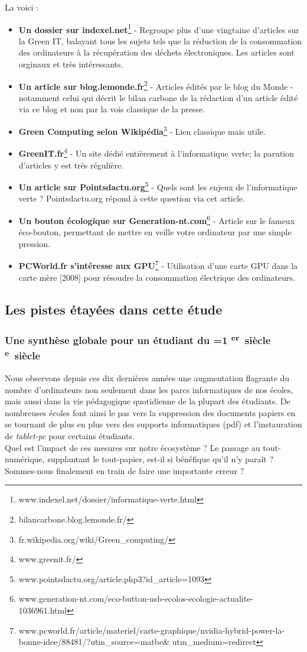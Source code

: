 \documentclass[a4paper,11pt,french]{article}
\newcommand*{\siecle}[1]{%
\ifnum#1=1%
\bsc{\romannumeral #1}\textsuperscript{er}~siècle%
\else%
\bsc{\romannumeral #1}\textsuperscript{e}~siècle%
\fi}
\begin{document}
La voici :
\begin{itemize}
\item \textbf{Un dossier sur indexel.net}\footnote{\textsf{www.indexel.net/dossier/informatique-verte.html}} - Regroupe plus d'une vingtaine d'articles sur la Green IT, balayant tous les sujets tels que la réduction de la consommation des ordinateurs à la récupération des déchets électroniques. Les articles sont orginaux et très intéressants.
\item \textbf{Un article sur blog.lemonde.fr}\footnote{\textsf{bilancarbone.blog.lemonde.fr/}} - Articles édités par le blog du Monde - notamment celui qui décrit le bilan carbone de la rédaction d'un article édité via ce blog et non par la vois classique de la presse.
\item \textbf{Green Computing selon Wikipédia}\footnote{\textsf{fr.wikipedia.org/wiki/Green\_{}computing/}} - Lien classique mais utile.
\item \textbf{GreenIT.fr}\footnote{\textsf{www.greenit.fr/}} - Un site dédié entièrement à l'informatique verte; la parution d'articles y est très régulière.
\item \textbf{Un article sur Pointsdactu.org}\footnote{\textsf{www.pointsdactu.org/article.php3?id\_{}article=1093}} - Quels sont les enjeux de l'informatique verte ? Pointsdactu.org répond à cette question via cet article.
\item \textbf{Un bouton écologique sur Generation-nt.com}\footnote{\textsf{www.generation-nt.com/eco-button-usb-ecolos-ecologie-actualite-1036961.html}} - Article sur le fameux éco-bouton, permettant de mettre en veille votre ordinateur par une simple pression.
\item \textbf{PCWorld.fr s'intéresse aux GPU}\footnote{\textsf{www.pcworld.fr/article/materiel/carte-graphique/nvidia-hybrid-power-la-bonne-idee/88481/?utm\_{}source=matbe\& utm\_{}medium=redirect}} - Utilisation d'une carte GPU dans la carte mère [2008] pour résoudre la consommation électrique des ordinateurs.
\end{itemize}


\subsection{Les pistes étayées dans cette étude}
\subsubsection{Une synthèse globale pour un étudiant du \siecle{21}}
Nous observons depuis ces dix dernières années une augmentation flagrante du nombre d'ordinateurs non seulement dans les parcs informatiques de nos écoles, mais aussi dans la vie pédagogique quotidienne de la plupart des étudiants. De nombreuses écoles font ainsi le pas vers la suppression des documents papiers en se tournant de plus en plus vers des supports informatiques (\textsf{pdf}) et l'instauration de \textit{tablet-pc} pour certains étudiants.\\
Quel est l'impact de ces mesures sur notre écosystème ? Le passage au tout-numérique, supplantant le tout-papier, est-il si bénéfique qu'il n'y paraît ? Sommes-nous finalement en train de faire une importante erreur ?
\end{document}
